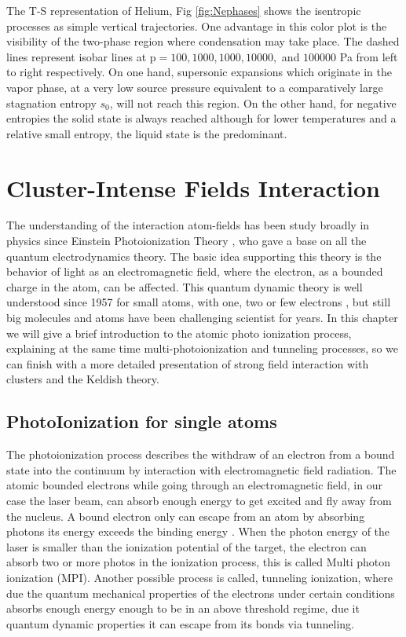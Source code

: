 The T-S representation of Helium, Fig \ref{fig:Nephases} shows the isentropic processes as simple vertical trajectories. One advantage in this color plot is the visibility of the two-phase region where condensation may take place. The dashed lines represent isobar lines at p$= 100,1000,1000,10000,$ and $100000$ Pa from left to right respectively. On one hand, supersonic expansions which originate in the vapor phase, at a very low source pressure equivalent to a comparatively large stagnation entropy $s_{0}$, will not reach this region. On the other hand, for negative entropies the solid state is always reached although for lower temperatures and a relative small entropy, the liquid state is the predominant.\cite{christen_supersonic_2010-1} 

\section{Cluster-Intense Fields  Interaction}


The understanding of the interaction atom-fields has been study broadly in physics since Einstein Photoionization Theory \cite{einstein_uber_1905}, who gave a base on all the quantum electrodynamics theory. The basic idea supporting  this theory is the behavior of light as an electromagnetic field, where the electron, as a bounded charge in the atom, can be affected.  This quantum dynamic theory is well understood since 1957 for small atoms, with one, two or few electrons \cite{a._bethe_quantum_1957}, but still big molecules and atoms have been challenging scientist for years. In this chapter we will give a brief introduction to the atomic photo ionization process, explaining at the same time multi-photoionization and tunneling processes, so we can finish with a more detailed presentation of strong field interaction with clusters and the Keldish theory.

\subsection{PhotoIonization for single atoms}

The photoionization process describes the withdraw of an electron from a bound state into the continuum by interaction with electromagnetic field radiation\cite{berkowitz_photoabsorption_1979}. The atomic bounded electrons while going through an electromagnetic field, in our case the laser beam, can absorb enough energy to get excited and fly away from the nucleus. A bound electron only can escape from an atom by absorbing photons its energy exceeds the binding energy \cite{einstein_uber_1905}. When the photon energy of the laser is smaller than the ionization potential of the target, the electron can absorb two or more photos in the ionization process, this is called Multi photon ionization (MPI). Another possible process is called, tunneling ionization, where due the quantum mechanical properties of the electrons under certain conditions absorbs enough energy enough to be in an above threshold regime, due it quantum dynamic properties it can escape from its bonds via tunneling.

